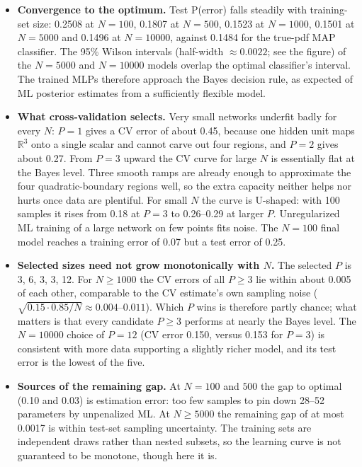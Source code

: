 \documentclass[11pt]{article}
\begin{document}
\begin{itemize}
\item \textbf{Convergence to the optimum.} Test P(error) falls steadily with training-set size: 0.2508 at $N=100$, 0.1807 at $N=500$, 0.1523 at $N=1000$, 0.1501 at $N=5000$ and 0.1496 at $N=10000$, against 0.1484 for the true-pdf MAP classifier. The 95\% Wilson intervals (half-width $\approx0.0022$; see the figure) of the $N=5000$ and $N=10000$ models overlap the optimal classifier's interval. The trained MLPs therefore approach the Bayes decision rule, as expected of ML posterior estimates from a sufficiently flexible model.
\item \textbf{What cross-validation selects.} Very small networks underfit badly for every $N$: $P=1$ gives a CV error of about 0.45, because one hidden unit maps $\mathbb R^3$ onto a single scalar and cannot carve out four regions, and $P=2$ gives about 0.27. From $P=3$ upward the CV curve for large $N$ is essentially flat at the Bayes level. Three smooth ramps are already enough to approximate the four quadratic-boundary regions well, so the extra capacity neither helps nor hurts once data are plentiful. For small $N$ the curve is U-shaped: with 100 samples it rises from 0.18 at $P=3$ to 0.26--0.29 at larger $P$. Unregularized ML training of a large network on few points fits noise. The $N=100$ final model reaches a training error of 0.07 but a test error of 0.25.
\item \textbf{Selected sizes need not grow monotonically with $N$.} The selected $P$ is 3, 6, 3, 3, 12. For $N\ge1000$ the CV errors of all $P\ge3$ lie within about 0.005 of each other, comparable to the CV estimate's own sampling noise ($\sqrt{0.15\cdot0.85/N}\approx0.004$--$0.011$). Which $P$ wins is therefore partly chance; what matters is that every candidate $P\ge3$ performs at nearly the Bayes level. The $N=10000$ choice of $P=12$ (CV error 0.150, versus 0.153 for $P=3$) is consistent with more data supporting a slightly richer model, and its test error is the lowest of the five.
\item \textbf{Sources of the remaining gap.} At $N=100$ and $500$ the gap to optimal (0.10 and 0.03) is estimation error: too few samples to pin down 28--52 parameters by unpenalized ML. At $N\ge5000$ the remaining gap of at most 0.0017 is within test-set sampling uncertainty. The training sets are independent draws rather than nested subsets, so the learning curve is not guaranteed to be monotone, though here it is.
\end{itemize}
\end{document}
